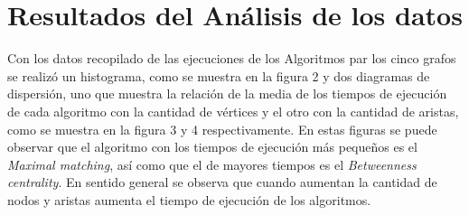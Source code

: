 \documentclass{article}
\begin{document}
\newpage

\section{Resultados del Análisis de los datos}

Con los datos recopilado de las ejecuciones de los Algoritmos par los cinco grafos se realizó un histograma, como se muestra en la figura 2 y dos diagramas de dispersión, uno que muestra la relación de la media de los tiempos de ejecución de cada algoritmo con la cantidad de vértices y el otro con la cantidad de aristas, como se muestra en la figura 3 y 4 respectivamente. En estas figuras se puede observar que el algoritmo con los tiempos de ejecución más pequeños es el \textit{Maximal matching}, así como que el de mayores tiempos es el \textit{Betweenness centrality}. En sentido general se observa que cuando aumentan la cantidad de nodos y aristas aumenta el tiempo de ejecución de los algoritmos.



  
\begin{center}

\end{center}

\newpage
\begin{center}

\end{center}
\end{document}
